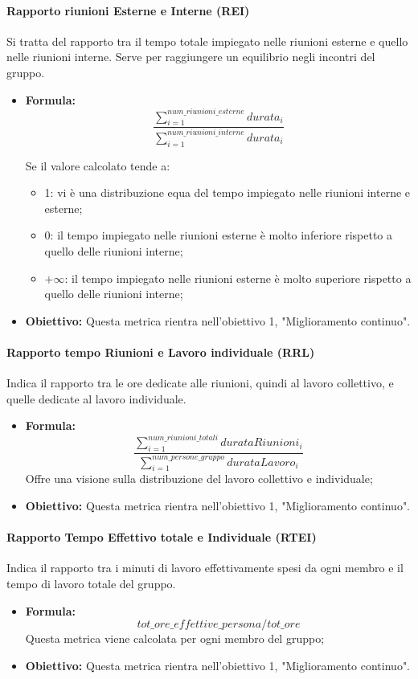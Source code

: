 	\paragraph{Rapporto riunioni Esterne e Interne (REI)}
	Si tratta del rapporto tra il tempo totale impiegato nelle riunioni esterne e quello nelle riunioni interne. Serve per raggiungere un equilibrio negli incontri del gruppo.
	\begin{itemize}
		\item {\textbf{Formula: }}\[\frac{\sum_{i=1}^{num\_riunioni\_esterne} durata_i}{\sum_{i=1}^{num\_riunioni\_interne} durata_i}\]
		
		Se il valore calcolato tende a:
		\begin{itemize}
			\item 1: vi è una distribuzione equa del tempo impiegato nelle riunioni interne e esterne;
			\item 0: il tempo impiegato nelle riunioni esterne è molto inferiore rispetto a quello delle riunioni interne;
			\item $+\infty$: il tempo impiegato nelle riunioni esterne è molto superiore rispetto a quello delle riunioni interne;
		\end{itemize}
		\item {\textbf{Obiettivo: }}Questa metrica rientra nell'obiettivo 1, "Miglioramento continuo".
	\end{itemize}
	
	\paragraph{Rapporto tempo Riunioni e Lavoro individuale (RRL)}
	Indica il rapporto tra le ore dedicate alle riunioni, quindi al lavoro collettivo, e quelle dedicate al lavoro individuale.
	\begin{itemize}
		\item \textbf{Formula:}\[\dfrac{\sum_{i=1}^{num\_riunioni\_totali} durataRiunioni_i}{\sum_{i=1}^{num\_persone\_gruppo} durataLavoro_i}\]
		Offre una visione sulla distribuzione del lavoro collettivo e individuale;
		\item \textbf{Obiettivo:} Questa metrica rientra nell'obiettivo 1, "Miglioramento continuo".
	\end{itemize}
	
	\paragraph{Rapporto Tempo Effettivo totale e Individuale (RTEI)}
	Indica il rapporto tra i minuti di lavoro effettivamente spesi da ogni membro e il tempo di lavoro totale del gruppo.
	\begin{itemize}
		\item \textbf{Formula:}\[tot\_ore\_effettive\_persona / tot\_ore
		\]Questa metrica viene calcolata per ogni membro del gruppo;
		\item \textbf{Obiettivo:} Questa metrica rientra nell'obiettivo 1, "Miglioramento continuo".
	\end{itemize}
	
